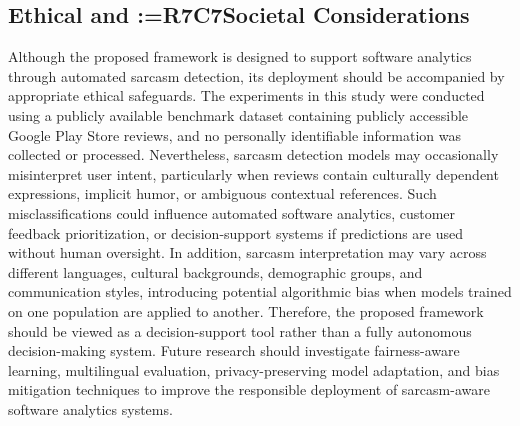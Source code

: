 \documentclass[a4paper,fleqn]{cas-sc}
\makeatletter
\newif\iftracked
\newcommand{\rv@recordone}[1]{%
  \edef\rv@i{#1}%
  \ifcsdef{rv@n@\rv@i}{}{\csgdef{rv@n@\rv@i}{0}}%
  \csxdef{rv@n@\rv@i}{\the\numexpr\csuse{rv@n@\rv@i}+1\relax}%
  \begingroup\edef\@currentlabel{\rv@i}\label{rv:\rv@i:\csuse{rv@n@\rv@i}}\endgroup}
\newcommand{\rv@record}[1]{\@for\rv@id:=#1\do{\expandafter\rv@recordone\expandafter{\rv@id}}}
\DeclareRobustCommand{\rce}[1]{\rv@record{R7C7}\iftracked{\color{rvEdit}#1}\else#1\fi}
\makeatother
\begin{document}
\subsection{Ethical and \rce{Societal Considerations}}
Although the proposed framework is designed to support software analytics through automated sarcasm detection, its deployment should be accompanied by appropriate ethical safeguards. The experiments in this study were conducted using a publicly available benchmark dataset containing publicly accessible Google Play Store reviews, and no personally identifiable information was collected or processed. Nevertheless, sarcasm detection models may occasionally misinterpret user intent, particularly when reviews contain culturally dependent expressions, implicit humor, or ambiguous contextual references. Such misclassifications could influence automated software analytics, customer feedback prioritization, or decision-support systems if predictions are used without human oversight. In addition, sarcasm interpretation may vary across different languages, cultural backgrounds, demographic groups, and communication styles, introducing potential algorithmic bias when models trained on one population are applied to another. Therefore, the proposed framework should be viewed as a decision-support tool rather than a fully autonomous decision-making system. Future research should investigate fairness-aware learning, multilingual evaluation, privacy-preserving model adaptation, and bias mitigation techniques to improve the responsible deployment of sarcasm-aware software analytics systems.

\end{document}

